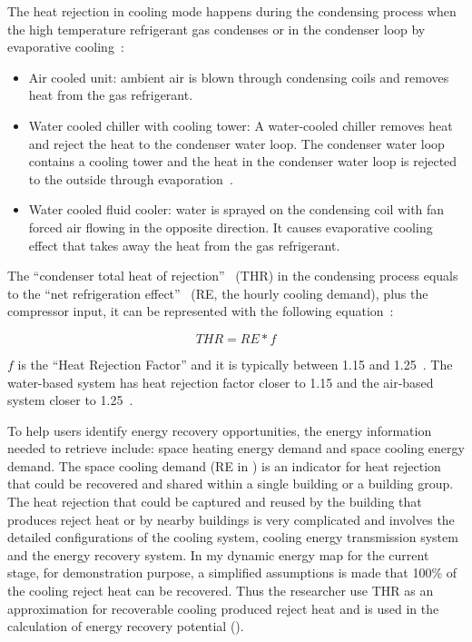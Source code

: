 The heat rejection in cooling mode happens during the condensing
process when the high temperature refrigerant gas condenses or in the
condenser loop by evaporative cooling~\cite{Bhatia2015}:
\begin{itemize}
\item Air cooled unit: ambient air is blown through condensing coils
  and removes heat from the gas refrigerant.
\item Water cooled chiller with cooling tower: A water-cooled chiller
  removes heat and reject the heat to the condenser water loop. The
  condenser water loop contains a cooling tower and the heat in the
  condenser water loop is rejected to the outside through
  evaporation~\cite{coolingTower2015}.
\item Water cooled fluid cooler: water is sprayed on the condensing
  coil with fan forced air flowing in the opposite direction. It
  causes evaporative cooling effect that takes away the heat from the
  gas refrigerant.
\end{itemize}
The ``condenser total heat of rejection''~\cite{Bhatia2015} (THR) in
the condensing process equals to the ``net refrigeration effect''
~\cite{Bhatia2015}(RE, the hourly cooling demand), plus the compressor
input, it can be represented with the following equation~\cite{Bhatia2015}:

\begin{equation}\label{eq:reject}
THR = RE * f 
\end{equation}

$f$ is the ``Heat Rejection Factor'' and it is typically between 1.15
and 1.25~\cite{Bhatia2015}. The water-based system has heat rejection
factor closer to 1.15 and the air-based system closer to
1.25~\cite{Bhatia2015}.

To help users identify energy recovery opportunities, the energy
information needed to retrieve include: space heating energy demand
and space cooling energy demand. The space cooling demand (RE in
) is an indicator for heat rejection that could be
recovered and shared within a single building or a building group. The
heat rejection that could be captured and reused by the building that
produces reject heat or by nearby buildings is very complicated and
involves the detailed configurations of the cooling system, cooling
energy transmission system and the energy recovery system. In my
dynamic energy map for the current stage, for demonstration purpose, a
simplified assumptions is made that 100\% of the cooling reject heat
can be recovered. Thus the researcher use THR as an approximation for recoverable
cooling produced reject heat and is used in the calculation of energy
recovery potential ().

